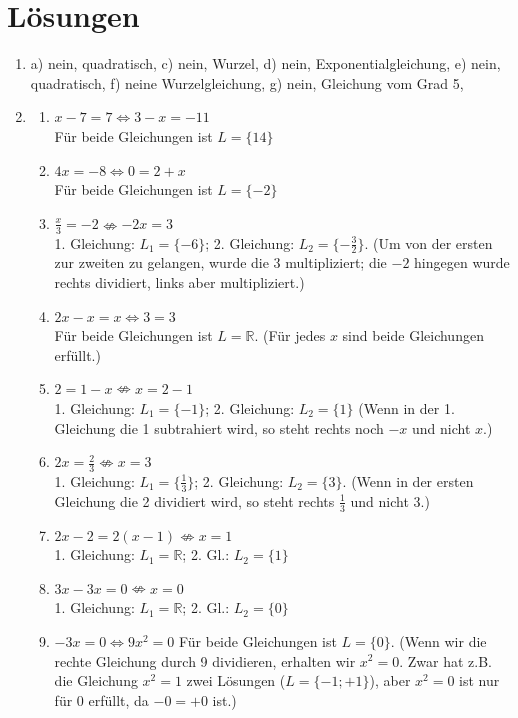 \documentclass[%
11pt,%
twoside,%
titlepage,%
german,%
]{scrartcl}
\begin{document}
\section*{L\"osungen}

\begin{enumerate}
\item a) nein, quadratisch, c) nein, Wurzel, d) nein, Exponentialgleichung, e) nein, quadratisch, f) neine Wurzelgleichung, g) nein, Gleichung vom Grad 5,
\item
  \begin{enumerate}
  \item $\displaystyle x-7=7 \Leftrightarrow 3-x=-11$ \\
    F\"ur beide Gleichungen ist $L=\{14\}$
  \item $\displaystyle 4x=-8 \Leftrightarrow 0=2+x$ \\
    F\"ur beide Gleichungen ist $L=\{-2\}$
  \item $\displaystyle \frac{x}{3}=-2 \nLeftrightarrow -2x=3$ \\
    1. Gleichung: $L_1=\{-6\}$; 2. Gleichung: $L_2=\{-\frac{3}{2}\}$. (Um von der ersten zur zweiten zu gelangen, wurde die 3 multipliziert; die $-2$ hingegen wurde rechts dividiert, links aber multipliziert.)
  \item $\displaystyle 2x-x=x \Leftrightarrow 3=3$ \\
    F\"ur beide Gleichungen ist $L=\mathbb{R}$. (F\"ur jedes $x$ sind beide Gleichungen erf\"ullt.)
  \item $\displaystyle 2=1-x \nLeftrightarrow x=2-1$ \\
    1. Gleichung: $L_1=\{-1\}$; 2. Gleichung: $L_2=\{1\}$ (Wenn in der 1. Gleichung die 1 subtrahiert wird, so steht rechts noch $-x$ und nicht $x$.)
  \item $\displaystyle 2x=\frac{2}{3} \nLeftrightarrow x=3$ \\
    1. Gleichung: $L_1=\{\frac{1}{3}\}$; 2. Gleichung: $L_2=\{3\}$. (Wenn in der ersten Gleichung die 2 dividiert wird, so steht rechts $\frac{1}{3}$ und nicht 3.)
  \item $\displaystyle 2x-2=2(x-1) \nLeftrightarrow x=1$ \\
    1. Gleichung: $L_1=\mathbb{R}$; 2. Gl.: $L_2=\{1\}$
  \item $\displaystyle 3x-3x=0 \nLeftrightarrow x=0$ \\
    1. Gleichung: $L_1=\mathbb{R}$; 2. Gl.: $L_2=\{0\}$
  \item $\displaystyle -3x=0 \Leftrightarrow 9x^2=0$
    F\"ur beide Gleichungen ist $L=\{0\}$. (Wenn wir die rechte Gleichung durch 9 dividieren, erhalten wir $x^2=0$. Zwar hat z.B. die Gleichung $x^2=1$ zwei L\"osungen ($L=\{-1;+1\}$), aber $x^2=0$ ist nur f\"ur 0 erf\"ullt, da $-0=+0$ ist.)
  \end{enumerate}


\end{enumerate}
\end{document}
